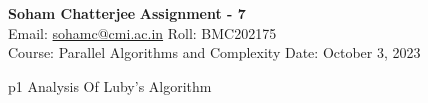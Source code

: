 \documentclass[a4paper, 11pt]{article}
\begin{document}
	
	
\textsf{\noindent \large\textbf{Soham Chatterjee} \hfill \textbf{Assignment - 7}\\
	Email: \href{sohamc@cmi.ac.in}{sohamc@cmi.ac.in} \hfill Roll: BMC202175\\
	\normalsize Course: Parallel Algorithms and Complexity \hfill Date: October 3, 2023}
	
	
\begin{problem}{%
	}{p1%
	}
Analysis Of Luby's Algorithm
		
\end{problem}
	
\end{document}
